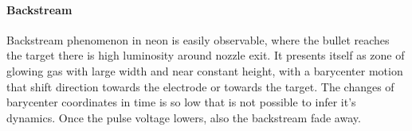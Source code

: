\paragraph{Backstream}
Backstream phenomenon in neon is easily observable, where the bullet reaches the target there is high luminosity around nozzle exit. It presents itself as zone of glowing gas with large width and near constant height, with a barycenter motion that shift direction towards the electrode or towards the target. The changes of barycenter coordinates in time is so low that is not possible to infer it's dynamics. Once the pulse voltage lowers, also the backstream fade away.
\begin{figure}
 \centering
 \hfill
 
 \hfill
 

\end{figure}

